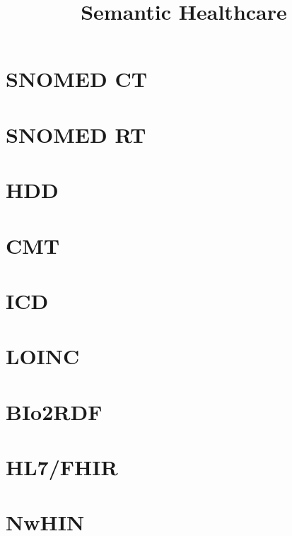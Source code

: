 \documentclass[DIV=calc, paper=a4, fontsize=12pt, onecolumn]{scrartcl}	 %
\title{Semantic Healthcare} %
\author{\authoring} %
\date{} %
\begin{document}
\maketitle

\begin{minipage}[t]{\textwidth}
\center{\bfseries\contentsname}
\begin{center}
\makeatletter
{}
\makeatother
\end{center}
\end{minipage}

\thispagestyle{fancy} %
\section[Systematized Nomenclature in Medicine - Clinical Terms ( SNOMED CT )]{SNOMED CT}
\section[Systematized Nomenclature in Medicine - Reference Terminology ( SNOMED  RT )]{SNOMED RT}
\section[Healthcare Data Dictionary ( HDD )]{HDD}
\section[Convergent Medical Terminology ( CMT )]{CMT}
\section[International Classification of Diseases ( ICD )]{ICD}
\section[Logical Observation Identifier Names and Codes terminology ( LOINC )]{LOINC}
\section[Bio2RDF]{BIo2RDF}
\section[Fast Health Interoperable Resources (HL7/FHIR)]{HL7/FHIR}
\section[Nationwide Health Information Network ( NwHIN )]{NwHIN}
\end{document}
